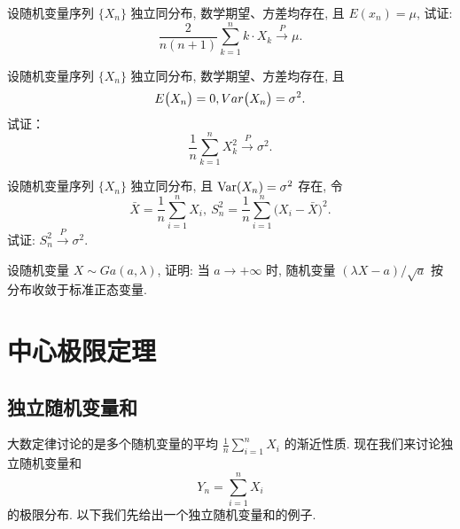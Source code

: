 \begin{xiti}
    \item 设随机变量序列 $ \{ X_n \} $ 独立同分布, 数学期望、方差均存在, 且 $ E ( x_n ) = \mu $, 试证:
    \begin{equation*}
        \frac{2}{n ( n + 1 )} \sum_{k = 1}^n k \cdot X_k \stackrel{P}{\to} \mu.
    \end{equation*}
    \item 设随机变量序列 $ \{ X_n \} $ 独立同分布, 数学期望、方差均存在, 且
    \begin{equation*}
        E \bigl( X_n \bigr) = 0, \\Var  \bigl( X_n \bigr) = \sigma^2.
    \end{equation*}
    试证：
    \begin{equation*}
        \frac{1}{n} \sum_{k = 1}^n X_k^2 \stackrel{P}{\to} \sigma^2.
    \end{equation*}
    \item 设随机变量序列 $ \{ X_n \} $ 独立同分布, 且 $\operatorname{Var}  (X_n) = \sigma^2 $ 存在, 令
    \begin{equation*}
        \bar{X} = \frac{1}{n} \sum_{i=1}^n X_i, \ S_n^2 = \frac{1}{n} \sum_{i=1}^n \bigl( X_i - \bar{X} \bigr)^2.
    \end{equation*}
    试证: $ S_n^2 \stackrel{P}{\to} \sigma^2 $.
    \item 设随机变量 $ X \sim Ga ( a, \lambda ) $, 证明: 当 $ a \to +\infty $ 时, 随机变量 $ ( \lambda X - a )/\sqrt{a} $ 按分布收敛于标准正态变量.
\end{xiti}


\section{中心极限定理}

\subsection{独立随机变量和}

大数定律讨论的是多个随机变量的平均 $ \frac{1}{n} \sum_{i=1}^n X_i $ 的渐近性质.
现在我们来讨论独立随机变量和
\begin{equation*}
    Y_n = \sum_{i=1}^n X_i
\end{equation*}
的极限分布.
以下我们先给出一个独立随机变量和的例子.

